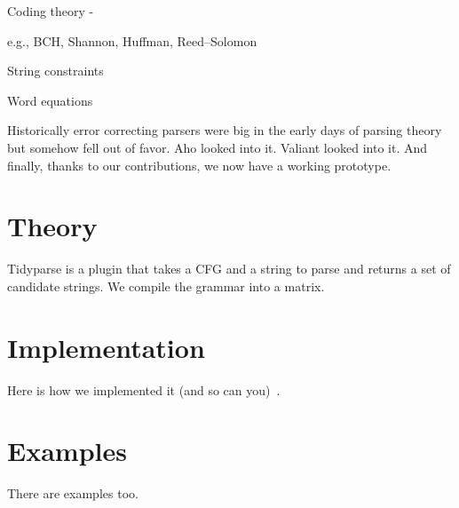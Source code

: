 \documentclass[sigplan,nonacm]{acmart}\settopmatter{printfolios=false,printccs=false,printacmref=false}
\begin{document}
Coding theory -

e.g., BCH, Shannon, Huffman, Reed–Solomon

String constraints

Word equations

Historically error correcting parsers were big in the early days of parsing theory but somehow fell out of favor. Aho looked into it. Valiant looked into it. And finally, thanks to our contributions, we now have a working prototype.

\section{Theory}

Tidyparse is a plugin that takes a CFG and a string to parse and returns a set of candidate strings. We compile the grammar into a matrix.

\section{Implementation}
    Here is how we implemented it (and so can you)~\cite{valiant1975general}.
\section{Examples}
    There are examples too.

\end{document}
